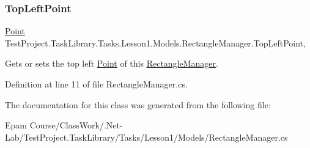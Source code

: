 \subsubsection{\texorpdfstring{TopLeftPoint}{TopLeftPoint}}
{\footnotesize\ttfamily \mbox{\hyperlink{class_test_project_1_1_task_library_1_1_tasks_1_1_lesson1_1_1_models_1_1_point}{Point}} Test\+Project.\+Task\+Library.\+Tasks.\+Lesson1.\+Models.\+Rectangle\+Manager.\+Top\+Left\+Point\hspace{0.3cm}{\ttfamily [get]}, {\ttfamily [set]}}



Gets or sets the top left \mbox{\hyperlink{class_test_project_1_1_task_library_1_1_tasks_1_1_lesson1_1_1_models_1_1_point}{Point}} of this \mbox{\hyperlink{class_test_project_1_1_task_library_1_1_tasks_1_1_lesson1_1_1_models_1_1_rectangle_manager}{Rectangle\+Manager}}. 



Definition at line 11 of file Rectangle\+Manager.\+cs.



The documentation for this class was generated from the following file\+:\begin{DoxyCompactItemize}
\item 
Epam Course/\+Class\+Work/.\+Net-\/\+Lab/\+Test\+Project.\+Task\+Library/\+Tasks/\+Lesson1/\+Models/Rectangle\+Manager.\+cs\end{DoxyCompactItemize}
